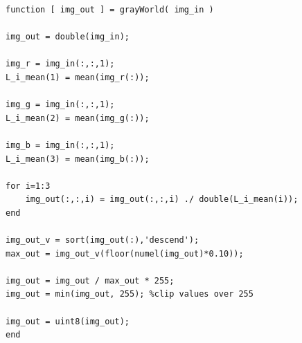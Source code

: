 \documentclass[
a4paper,     %
11pt         %
]{scrartcl}  %
\begin{document}
\begin{lstlisting}[label=lst:colConst_GW, caption=MATLAB implementation of grayWorld]
function [ img_out ] = grayWorld( img_in )

img_out = double(img_in);

img_r = img_in(:,:,1);
L_i_mean(1) = mean(img_r(:));

img_g = img_in(:,:,1);
L_i_mean(2) = mean(img_g(:));

img_b = img_in(:,:,1);
L_i_mean(3) = mean(img_b(:));

for i=1:3
    img_out(:,:,i) = img_out(:,:,i) ./ double(L_i_mean(i));
end

img_out_v = sort(img_out(:),'descend');
max_out = img_out_v(floor(numel(img_out)*0.10));

img_out = img_out / max_out * 255;
img_out = min(img_out, 255); %clip values over 255

img_out = uint8(img_out);
end
\end{lstlisting}
\end{document}
